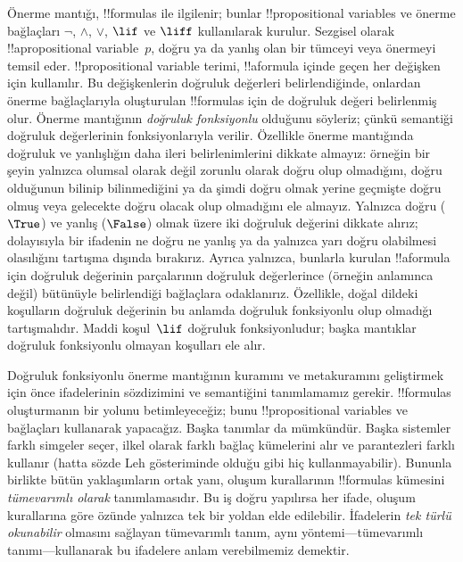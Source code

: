 \documentclass[../../../include/open-logic-section]{subfiles}
\begin{document}


Önerme mantığı, !!{formula}s ile ilgilenir; bunlar !!{propositional variable}s
ve önerme bağlaçları $\lnot$, $\land$, $\lor$, $\lif$ ve $\liff$
kullanılarak kurulur. Sezgisel olarak !!a{propositional variable}~$p$, doğru
ya da yanlış olan bir tümceyi veya önermeyi temsil eder.
!!{propositional variable} terimi, !!a{formula} içinde geçen her değişken
için kullanılır. Bu değişkenlerin doğruluk değerleri belirlendiğinde,
onlardan önerme bağlaçlarıyla oluşturulan !!{formula}s için de doğruluk
değeri belirlenmiş olur. Önerme mantığının \emph{doğruluk
  fonksiyonlu} olduğunu söyleriz; çünkü semantiği doğruluk değerlerinin
fonksiyonlarıyla verilir. Özellikle önerme mantığında doğruluk ve yanlışlığın
daha ileri belirlenimlerini dikkate almayız: örneğin bir şeyin yalnızca
olumsal olarak değil zorunlu olarak doğru olup olmadığını, doğru olduğunun
bilinip bilinmediğini ya da şimdi doğru olmak yerine geçmişte doğru olmuş
veya gelecekte doğru olacak olup olmadığını ele almayız. Yalnızca doğru
($\True$) ve yanlış ($\False$) olmak üzere iki doğruluk değerini dikkate
alırız; dolayısıyla bir ifadenin ne doğru ne yanlış ya da yalnızca yarı doğru
olabilmesi olasılığını tartışma dışında bırakırız. Ayrıca yalnızca, bunlarla
kurulan !!a{formula} için doğruluk değerinin parçalarının doğruluk değerlerince
(örneğin anlamınca değil) bütünüyle belirlendiği bağlaçlara odaklanırız.
Özellikle, doğal dildeki koşulların doğruluk değerinin bu anlamda doğruluk
fonksiyonlu olup olmadığı tartışmalıdır. Maddi koşul~$\lif$ doğruluk
fonksiyonludur; başka mantıklar doğruluk fonksiyonlu olmayan koşulları ele
alır.

Doğruluk fonksiyonlu önerme mantığının kuramını ve metakuramını geliştirmek
için önce ifadelerinin sözdizimini ve semantiğini tanımlamamız gerekir.
!!{formula}s oluşturmanın bir yolunu betimleyeceğiz; bunu
!!{propositional variable}s ve bağlaçları kullanarak yapacağız. Başka tanımlar da mümkündür. Başka
sistemler farklı simgeler seçer, ilkel olarak farklı bağlaç kümelerini alır ve
parantezleri farklı kullanır (hatta sözde Leh gösteriminde olduğu gibi hiç
kullanmayabilir). Bununla birlikte bütün yaklaşımların ortak yanı, oluşum
kurallarının !!{formula}s kümesini \emph{tümevarımlı olarak} tanımlamasıdır.
Bu iş doğru yapılırsa her ifade, oluşum kurallarına göre özünde yalnızca tek
bir yoldan elde edilebilir. İfadelerin \emph{tek türlü okunabilir} olmasını
sağlayan tümevarımlı tanım, aynı yöntemi---tümevarımlı tanımı---kullanarak bu
ifadelere anlam verebilmemiz demektir.
\end{document}
